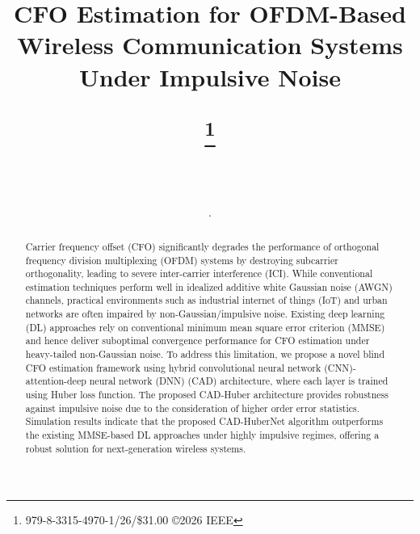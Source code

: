 \documentclass[10pt, journal]{IEEEtran}
\begin{document}
\title{CFO Estimation for OFDM-Based Wireless Communication Systems Under Impulsive Noise

\thanks{979-8-3315-4970-1/26/\$31.00 ©2026 IEEE}
}

\author{
     \\
    
     \\

     . \\

} 



\maketitle

\begin{abstract}
Carrier frequency offset (CFO) significantly degrades the performance of orthogonal frequency division multiplexing (OFDM) systems by destroying subcarrier orthogonality, leading to severe inter-carrier interference (ICI). While conventional estimation techniques perform well in idealized additive white Gaussian noise (AWGN) channels, practical environments such as industrial internet of things (IoT) and urban networks are often impaired by non-Gaussian/impulsive noise. Existing deep learning (DL) approaches rely on conventional minimum mean square error criterion (MMSE) and hence deliver suboptimal convergence performance for CFO estimation under heavy-tailed non-Gaussian noise. To address this limitation, we propose a novel blind CFO estimation framework using hybrid convolutional neural network (CNN)-attention-deep neural network (DNN) (CAD) architecture, where each layer is trained using Huber loss function. The proposed CAD-Huber architecture provides robustness against impulsive noise due to the consideration of higher order error statistics. Simulation results indicate that the proposed CAD-HuberNet algorithm outperforms the existing MMSE-based DL approaches under highly impulsive regimes, offering a robust solution for next-generation wireless systems.
\end{abstract}
\end{document}
